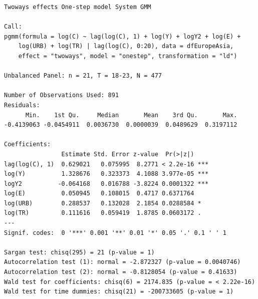 \documentclass[
  11pt,
]{article}
\begin{document}
\begin{verbatim}
Twoways effects One-step model System GMM 

Call:
pgmm(formula = log(C) ~ lag(log(C), 1) + log(Y) + logY2 + log(E) + 
    log(URB) + log(TR) | lag(log(C), 0:20), data = dfEuropeAsia, 
    effect = "twoways", model = "onestep", transformation = "ld")

Unbalanced Panel: n = 21, T = 18-23, N = 477

Number of Observations Used: 891
Residuals:
      Min.    1st Qu.     Median       Mean    3rd Qu.       Max. 
-0.4139063 -0.0454911  0.0036730  0.0000039  0.0489629  0.3197112 

Coefficients:
                Estimate Std. Error z-value  Pr(>|z|)    
lag(log(C), 1)  0.629021   0.075995  8.2771 < 2.2e-16 ***
log(Y)          1.328676   0.323373  4.1088 3.977e-05 ***
logY2          -0.064168   0.016788 -3.8224 0.0001322 ***
log(E)          0.050945   0.108015  0.4717 0.6371764    
log(URB)        0.288537   0.132028  2.1854 0.0288584 *  
log(TR)         0.111616   0.059419  1.8785 0.0603172 .  
---
Signif. codes:  0 '***' 0.001 '**' 0.01 '*' 0.05 '.' 0.1 ' ' 1

Sargan test: chisq(295) = 21 (p-value = 1)
Autocorrelation test (1): normal = -2.872327 (p-value = 0.0040746)
Autocorrelation test (2): normal = -0.8128054 (p-value = 0.41633)
Wald test for coefficients: chisq(6) = 2174.835 (p-value = < 2.22e-16)
Wald test for time dummies: chisq(21) = -200733605 (p-value = 1)
\end{verbatim}
\end{document}
